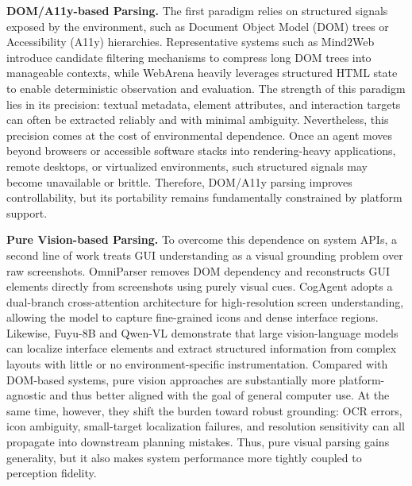 \textbf{DOM/A11y-based Parsing.}  
The first paradigm relies on structured signals exposed by the environment, such as Document Object Model (DOM) trees or Accessibility (A11y) hierarchies. Representative systems such as Mind2Web \cite{deng2023mind2web} introduce candidate filtering mechanisms to compress long DOM trees into manageable contexts, while WebArena \cite{zhou2023webarena} heavily leverages structured HTML state to enable deterministic observation and evaluation. The strength of this paradigm lies in its precision: textual metadata, element attributes, and interaction targets can often be extracted reliably and with minimal ambiguity. Nevertheless, this precision comes at the cost of environmental dependence. Once an agent moves beyond browsers or accessible software stacks into rendering-heavy applications, remote desktops, or virtualized environments, such structured signals may become unavailable or brittle. Therefore, DOM/A11y parsing improves controllability, but its portability remains fundamentally constrained by platform support.

\textbf{Pure Vision-based Parsing.}  
To overcome this dependence on system APIs, a second line of work treats GUI understanding as a visual grounding problem over raw screenshots. OmniParser \cite{lu2024omniparser} removes DOM dependency and reconstructs GUI elements directly from screenshots using purely visual cues. CogAgent \cite{hong2024cogagent} adopts a dual-branch cross-attention architecture for high-resolution screen understanding, allowing the model to capture fine-grained icons and dense interface regions. Likewise, Fuyu-8B \cite{fuyu-8b} and Qwen-VL \cite{bai2023versatile} demonstrate that large vision-language models can localize interface elements and extract structured information from complex layouts with little or no environment-specific instrumentation. Compared with DOM-based systems, pure vision approaches are substantially more platform-agnostic and thus better aligned with the goal of general computer use. At the same time, however, they shift the burden toward robust grounding: OCR errors, icon ambiguity, small-target localization failures, and resolution sensitivity can all propagate into downstream planning mistakes. Thus, pure visual parsing gains generality, but it also makes system performance more tightly coupled to perception fidelity.

